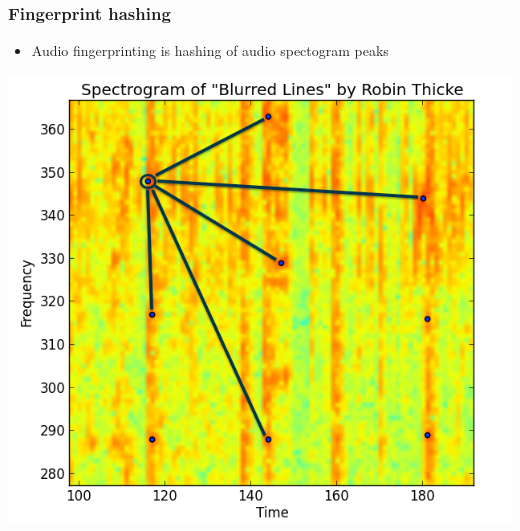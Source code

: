 \documentclass{beamer}
\begin{document}

\begin{frame}
\frametitle{Fingerprint hashing}
\begin{itemize}
    \item Audio fingerprinting is hashing of audio spectogram peaks
\end{itemize}

\begin{center}
    \includegraphics[width=0.6\linewidth]{pics/spectrogram_zoomed}
\end{center}
\end{frame}

\end{document}

